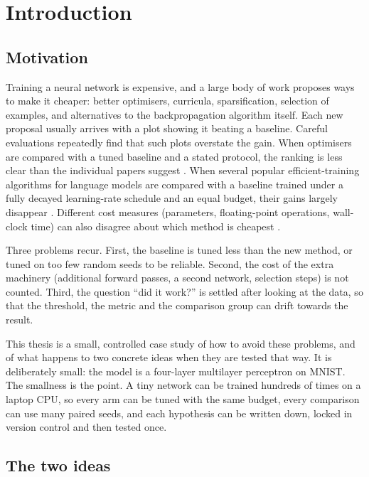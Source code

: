 \chapter{Introduction}\label{ch:intro}

\section{Motivation}
Training a neural network is expensive, and a large body of work proposes ways to make it cheaper: better optimisers, curricula, sparsification, selection of examples, and alternatives to the backpropagation algorithm itself. Each new proposal usually arrives with a plot showing it beating a baseline. Careful evaluations repeatedly find that such plots overstate the gain. When optimisers are compared with a tuned baseline and a stated protocol, the ranking is less clear than the individual papers suggest \citep{schmidt2021crowded}. When several popular efficient-training algorithms for language models are compared with a baseline trained under a fully decayed learning-rate schedule and an equal budget, their gains largely disappear \citep{kaddour2023notrain}. Different cost measures (parameters, floating-point operations, wall-clock time) can also disagree about which method is cheapest \citep{dehghani2022efficiency}.

Three problems recur. First, the baseline is tuned less than the new method, or tuned on too few random seeds to be reliable. Second, the cost of the extra machinery (additional forward passes, a second network, selection steps) is not counted. Third, the question ``did it work?'' is settled after looking at the data, so that the threshold, the metric and the comparison group can drift towards the result.

This thesis is a small, controlled case study of how to avoid these problems, and of what happens to two concrete ideas when they are tested that way. It is deliberately small: the model is a four-layer multilayer perceptron on MNIST. The smallness is the point. A tiny network can be trained hundreds of times on a laptop CPU, so every arm can be tuned with the same budget, every comparison can use many paired seeds, and each hypothesis can be written down, locked in version control and then tested once.

\section{The two ideas}
